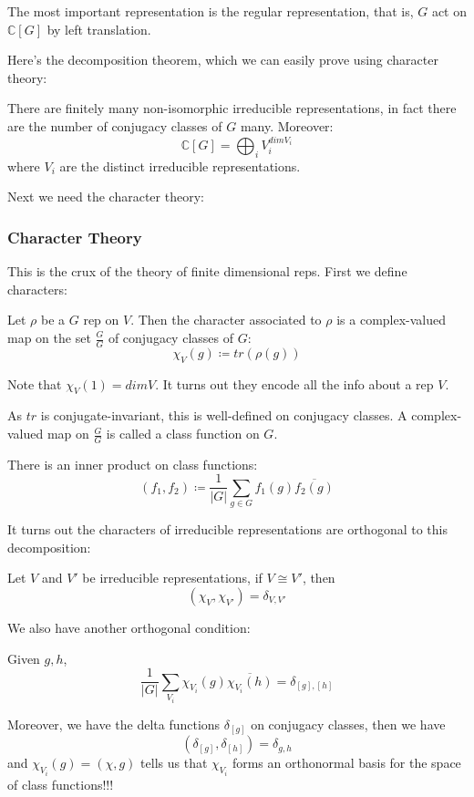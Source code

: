 \documentclass[main.tex]{subfiles}
\begin{document}
The most important representation is the regular representation, that is, $G$ act on $\mathbb{C}[G]$ by left translation.

Here's the decomposition theorem, which we can easily prove using character theory:
\begin{theorem}
There are finitely many non-isomorphic irreducible representations, in fact there are the number of conjugacy classes of $G$ many. Moreover:
$$
\mathbb{C}[G] = \bigoplus_i V_i ^{dim V_i}
$$
where $V_i$ are the distinct irreducible representations.


\end{theorem}

Next we need the character theory:
\subsubsection{Character Theory}
This is the crux of the theory of finite dimensional reps. First we define characters:

\begin{definition}
Let $\rho$ be a $G$ rep on $V$. Then the character associated to $\rho$ is a complex-valued map on the set $\frac{G}{G}$ of conjugacy classes of $G$:
$$
\chi_V(g) \coloneqq tr(\rho(g))
$$
\end{definition}
Note that $\chi_V(1) = dim V$. It turns out they encode all the info about a rep $V$. 

As $tr$ is conjugate-invariant, this is well-defined on conjugacy classes. A complex-valued map on $\frac{G}{G}$ is called a class function on $G$.

There is an inner product on class functions:
$$
(f_1, f_2) \coloneqq \frac{1}{|G|}\sum_{g \in G} f_1(g) \overline{f_2(g)}
$$

It turns out the characters of irreducible representations are orthogonal to this decomposition:

\begin{lemma}
Let $V$ and $V'$ be irreducible representations, if $V \cong V'$, then 
$$
(\chi_V, \chi_{V'}) = \delta_{V, V'}
$$

\end{lemma}

We also have another orthogonal condition:
\begin{lemma}
Given $g, h$, 
$$
\frac{1}{|G|} \sum_{V_i}\chi_{V_i}(g) \overline{\chi_{V_i}(h)} = \delta_{[g], [h]}
$$
\end{lemma}

Moreover, we have the delta functions $\delta_{[g]}$ on conjugacy classes, then we have 
$$
(\delta_{[g]}, \delta_{[h]}) = \delta_{g,h}
$$
and $\chi_{V_i}(g) = (\chi, g)$ tells us that $\chi_{V_i}$ forms an orthonormal basis for the space of class functions!!!
\end{document}
